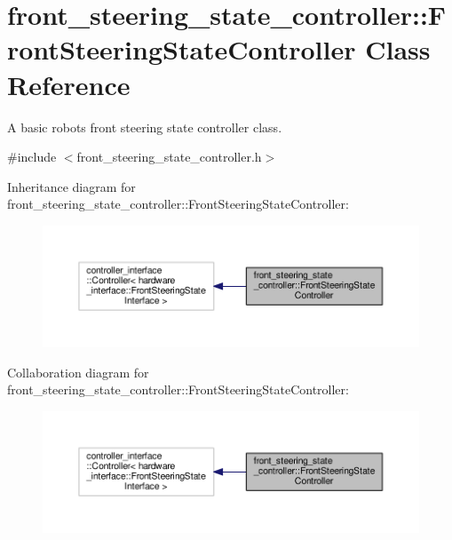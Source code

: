 \hypertarget{classfront__steering__state__controller_1_1FrontSteeringStateController}{}\section{front\+\_\+steering\+\_\+state\+\_\+controller\+:\+:Front\+Steering\+State\+Controller Class Reference}
\label{classfront__steering__state__controller_1_1FrontSteeringStateController}


A basic robot\textquotesingle{}s front steering state controller class.  




{\ttfamily \#include $<$front\+\_\+steering\+\_\+state\+\_\+controller.\+h$>$}



Inheritance diagram for front\+\_\+steering\+\_\+state\+\_\+controller\+:\+:Front\+Steering\+State\+Controller\+:\nopagebreak
\begin{figure}[H]
\begin{center}
\leavevmode
\includegraphics[width=350pt]{classfront__steering__state__controller_1_1FrontSteeringStateController__inherit__graph}
\end{center}
\end{figure}


Collaboration diagram for front\+\_\+steering\+\_\+state\+\_\+controller\+:\+:Front\+Steering\+State\+Controller\+:\nopagebreak
\begin{figure}[H]
\begin{center}
\leavevmode
\includegraphics[width=350pt]{classfront__steering__state__controller_1_1FrontSteeringStateController__coll__graph}
\end{center}
\end{figure}
